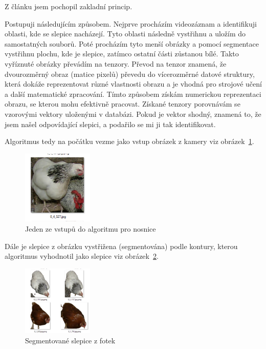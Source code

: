 Z článku jsem pochopil zakladní princip.

Postupuji následujícím způsobem.
Nejprve procházím videozáznam a identifikuji oblasti, kde se slepice nacházejí.
Tyto oblasti následně vystřihnu a uložím do samostatných souborů.
Poté procházím tyto menší obrázky a pomocí segmentace vystřihnu plochu, kde je slepice, zatímco ostatní části zůstanou bílé.
Takto vyříznuté obrázky převádím na tenzory.
Převod na tenzor znamená, že dvourozměrný obraz (matice pixelů) převedu do vícerozměrné datové struktury, která dokáže reprezentovat různé vlastnosti obrazu a je vhodná pro strojové učení a další matematické zpracování.
Tímto způsobem získám numerickou reprezentaci obrazu, se kterou mohu efektivně pracovat.
Získané tenzory porovnávám se vzorovými vektory uloženými v databázi.
Pokud je vektor shodný, znamená to, že jsem našel odpovídající slepici, a podařilo se mi ji tak identifikovat.

Algoritmus tedy na počátku vezme jako vstup obrázek z kamery viz obrázek~\ref{fig:source_chick_image}.

\begin{figure}[H]
    \centering
    \includegraphics[width=0.3\textwidth]{img/source_chick_image}
    \caption{Jeden ze vstupů do algoritmu pro nosnice}
    \label{fig:source_chick_image}
\end{figure}

Dále je slepice z obrázku vystřižena (segmentována) podle kontury, kterou algoritmus vyhodnotil jako slepice viz obrázek~\ref{fig:segmented_chicks2}.

\begin{figure}[H]
    \centering
    \includegraphics[width=0.3\textwidth]{img/segmented_chicks}
    \caption{Segmentované slepice z fotek}
    \label{fig:segmented_chicks2}
\end{figure}

